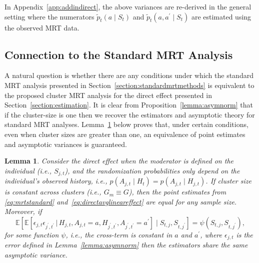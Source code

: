 \documentclass[12pt]{article}
\def\E{\mathbb{E}}
\def\given{\, | \,}
\newtheorem{lemma}[thm]{Lemma}
\begin{document}
In Appendix~\ref{app:addindirect}, the above variances are re-derived in the general setting where the numerators $\tilde p_t (a \mid S_t)$ and $\tilde p_t (a, a^\prime \mid S_t)$ are estimated using the observed MRT data.

\subsection{Connection to the Standard MRT Analysis}
\label{section:samesies}
A natural question is whether there are any conditions under which the standard MRT analysis presented in Section~\ref{section:standardmrtmethods} is equivalent to the proposed cluster MRT analysis for the direct effect presented in Section~\ref{section:estimation}. It is clear from Proposition~\ref{lemma:asymnorm} that if the cluster-size is one then we recover the estimators and asymptotic theory for standard MRT analyses.  Lemma~\ref{lemma:samesies} below proves that, under certain conditions, even when cluster sizes are greater than one, an equivalence of point estimates and asymptotic variances is guaranteed.

\begin{lemma}
\label{lemma:samesies}
Consider the direct effect when the moderator is defined on the individual (i.e., $S_{j,t}$), and the randomization probabilities only depend on the individual's observed history, i.e., $p(A_{j,t} \mid H_t) = p(A_{j,t} \mid H_{j,t})$.  If cluster size is constant across clusters (i.e., $G_m \equiv G$), then the point estimates from \eqref{eq:mrtstandard} and~\eqref{eq:directavglineareffect} are equal for any sample size. Moreover, if
\begin{equation}
    \label{eq:samesiescondition}
    \E \left[ \E \left[ \epsilon_{j,t} \epsilon_{j^\prime, t^\prime} \given H_{j,t}, A_{j,t}=a, H_{j^\prime, t^\prime}, A_{j^\prime, t^\prime} = a^\prime \right] \mid S_{t,j}, S_{t,j^\prime} \right] = \psi(S_{t,j}, S_{t,j^\prime}),
\end{equation}
for some function $\psi$, i.e., the cross-term is constant in $a$ and $a^\prime$, where $\epsilon_{j,t}$ is the error defined in Lemma~\ref{lemma:asymnorm} then the estimators share the same asymptotic variance.
\end{lemma}
\end{document}
